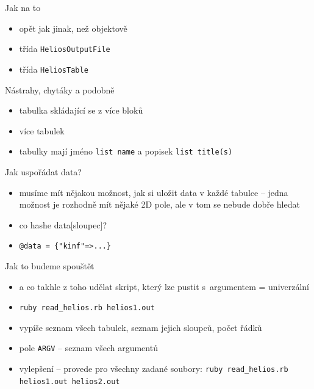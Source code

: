 \documentclass{beamer}
\begin{document}
\begin{frame}{Jak na to}
  \begin{itemize}
    \item opět jak jinak, než objektově
    \item třída \texttt{HeliosOutputFile}
    \item třída \texttt{HeliosTable}  
  \end{itemize}
\end{frame}

\begin{frame}{Nástrahy, chytáky a podobně}
  \begin{itemize}
    \item tabulka skládající se z více bloků
    \item více tabulek
    \item tabulky mají jméno \texttt{list name} a popisek \texttt{list title(s)}
  \end{itemize}
\end{frame}

\begin{frame}[fragile]{Jak uspořádat data?}
  \begin{itemize}
    \item musíme mít nějakou možnost, jak si uložit data v každé tabulce -- jedna možnost je rozhodně mít nějaké 2D pole, ale v tom se nebude dobře hledat
    \pause
    \item co hashe data[sloupec]?
    \pause
    \item \verb!@data = {"kinf"=>...}!
  \end{itemize}
\end{frame}

\begin{frame}{Jak to budeme spouštět}
  \begin{itemize}
    \item a co takhle z toho udělat skript, který lze pustit s~argumentem = univerzální
    \item \texttt{ruby read\_helios.rb helios1.out}
    \item vypíše seznam všech tabulek, seznam jejich sloupců, počet řádků
    \item pole \texttt{ARGV} -- seznam všech argumentů
    \item vylepšení – provede pro všechny zadané soubory: \texttt{ruby read\_helios.rb helios1.out helios2.out}
  \end{itemize}
\end{frame}
\end{document}
